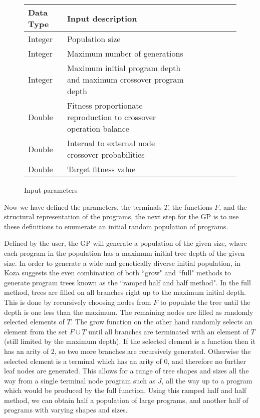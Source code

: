 \documentclass[a4paper,10.5pt]{article}
\begin{document}
\begin{figure}[H]
\centering
\caption{Input parameters}
\label{inputparam}
\begin{tabular}{l*{6}{l}r}
Data Type             & Input description\\
\hline
Integer & Population size\\
Integer & Maximum number of generations\\
Integer & Maximum initial program depth and maximum crossover program depth\\
Double & Fitness proportionate reproduction to crossover operation balance\\
Double & Internal to external node crossover probabilities\\
Double & Target fitness value\\
\end{tabular}
\end{figure}

Now we have defined the parameters, the terminals $T$, the functions $F$, and the structural representation of the programs, the next step for the GP is to use these definitions to enumerate an initial random population of programs.

Defined by the user, the GP will generate a population of the given size, where each program in the population has a maximum initial tree depth of the given size. In order to generate a wide and genetically diverse initial population, in \cite[p.11-14]{introgp} Koza suggests the even combination of both ``grow" and ``full" methods to generate program trees known as the ``ramped half and half method". In the full method, trees are filled on all branches right up to the maximum initial depth. This is done by recursively choosing nodes from $F$ to populate the tree until the depth is one less than the maximum. The remaining nodes are filled as randomly selected elements of $T$. The grow function on the other hand randomly selects an element from the set $F \cup T$ until all branches are terminated with an element of $T$ (still limited by the maximum depth). If the selected element is a function then it has an arity of 2, so two more branches are recursively generated. Otherwise the selected element is a terminal which has an arity of 0, and therefore no further leaf nodes are generated. This allows for a range of tree shapes and sizes all the way from a single terminal node program such as $J$, all the way up to a program which would be produced by the full function. Using this ramped half and half method, we can obtain half a population of large programs, and another half of programs with varying shapes and sizes.
\end{document}
